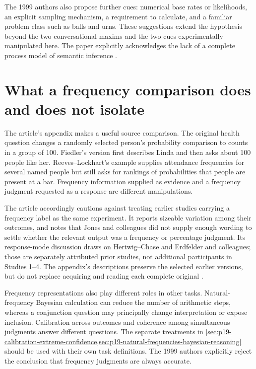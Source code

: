 The 1999 authors also propose further cues: numerical base rates
or likelihoods, an explicit sampling mechanism, a requirement
to calculate, and a familiar problem class such as balls and
urns. These suggestions extend the hypothesis beyond the two
conversational maxims and the two cues experimentally
manipulated here. The paper explicitly acknowledges the lack
of a complete process model of semantic inference
\cite[pp.~293--298]{HertwigGigerenzer1999Conjunction}.

\section{What a frequency comparison does and does not isolate}
\label{sec:p19-conjunction-language-comparison}

The article's appendix makes a useful source comparison.
The original health question changes a randomly selected
person's probability comparison to counts in a group of 100.
Fiedler's version first describes Linda and then asks about
100 people like her. Reeves--Lockhart's example supplies
attendance frequencies for several named people but still
asks for rankings of probabilities that people are present
at a bar. Frequency information supplied as evidence and a
frequency judgment requested as a response are different
manipulations.

The article accordingly cautions against treating earlier
studies carrying a frequency label as the same experiment.
It reports sizeable variation among their outcomes, and
notes that Jones and colleagues did not supply enough
wording to settle whether the relevant output was a
frequency or percentage judgment. Its response-mode
discussion draws on Hertwig--Chase and Erdfelder and
colleagues; those are separately attributed prior studies,
not additional participants in Studies 1--4.
The appendix's descriptions preserve the selected earlier
versions, but do not replace acquiring and reading each
complete original \cite[pp.~285--287,304--305]{HertwigGigerenzer1999Conjunction}.

Frequency representations also play different roles in other
tasks. Natural-frequency Bayesian calculation can reduce the
number of arithmetic steps, whereas a conjunction question
may principally change interpretation or expose inclusion.
Calibration across outcomes and coherence among simultaneous
judgments answer different questions. The separate treatments
in \cref{sec:p19-calibration-extreme-confidence,sec:p19-natural-frequencies-bayesian-reasoning}
should be used
with their own task definitions.
The 1999 authors explicitly reject the conclusion that
frequency judgments are always accurate.

